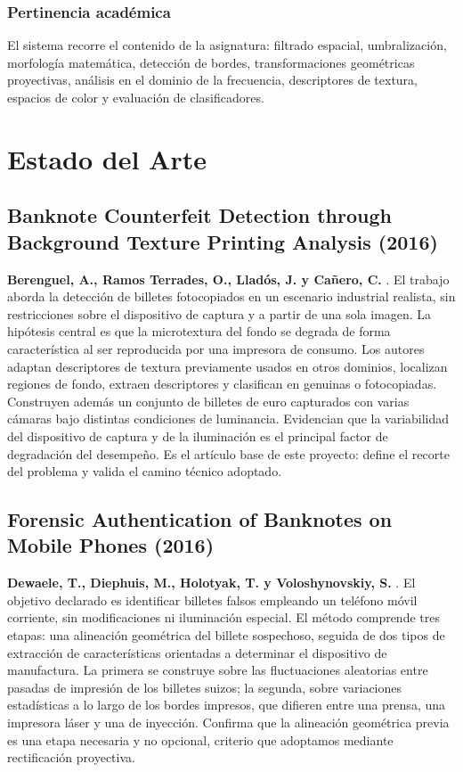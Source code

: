 \documentclass[conference]{IEEEtran}
\begin{document}
\subsubsection{Pertinencia académica}
El sistema recorre el contenido de la asignatura: filtrado espacial,
umbralización, morfología matemática, detección de bordes,
transformaciones geométricas proyectivas, análisis en el dominio de la
frecuencia, descriptores de textura, espacios de color y evaluación de
clasificadores.

\section{Estado del Arte}

\subsection{Banknote Counterfeit Detection through Background Texture
Printing Analysis (2016)}
\textbf{Berenguel, A., Ramos Terrades, O., Lladós, J. y Cañero, C.}
\cite{berenguel2016}. El trabajo aborda la detección de billetes
fotocopiados en un escenario industrial realista, sin restricciones
sobre el dispositivo de captura y a partir de una sola imagen. La
hipótesis central es que la microtextura del fondo se degrada de forma
característica al ser reproducida por una impresora de consumo. Los
autores adaptan descriptores de textura previamente usados en otros
dominios, localizan regiones de fondo, extraen descriptores y clasifican
en genuinas o fotocopiadas. Construyen además un conjunto de billetes de
euro capturados con varias cámaras bajo distintas condiciones de
luminancia. Evidencian que la variabilidad del dispositivo de captura y
de la iluminación es el principal factor de degradación del desempeño.
Es el artículo base de este proyecto: define el recorte del problema y
valida el camino técnico adoptado.

\subsection{Forensic Authentication of Banknotes on Mobile Phones (2016)}
\textbf{Dewaele, T., Diephuis, M., Holotyak, T. y Voloshynovskiy, S.}
\cite{dewaele2016}. El objetivo declarado es identificar billetes falsos
empleando un teléfono móvil corriente, sin modificaciones ni
iluminación especial. El método comprende tres etapas: una alineación
geométrica del billete sospechoso, seguida de dos tipos de extracción de
características orientadas a determinar el dispositivo de manufactura.
La primera se construye sobre las fluctuaciones aleatorias entre pasadas
de impresión de los billetes suizos; la segunda, sobre variaciones
estadísticas a lo largo de los bordes impresos, que difieren entre una
prensa, una impresora láser y una de inyección. Confirma que la
alineación geométrica previa es una etapa necesaria y no opcional,
criterio que adoptamos mediante rectificación proyectiva.
\end{document}
